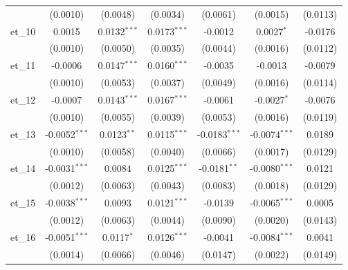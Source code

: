 \begin{tabular}{lcccccc}
                      & (0.0010)         & (0.0048)             & (0.0034)              & (0.0061)        & (0.0015)        & (0.0113)\\   
   et\_10             & 0.0015           & 0.0132$^{***}$       & 0.0173$^{***}$        & -0.0012         & 0.0027$^{*}$    & -0.0176\\   
                      & (0.0010)         & (0.0050)             & (0.0035)              & (0.0044)        & (0.0016)        & (0.0112)\\   
   et\_11             & -0.0006          & 0.0147$^{***}$       & 0.0160$^{***}$        & -0.0035         & -0.0013         & -0.0079\\   
                      & (0.0010)         & (0.0053)             & (0.0037)              & (0.0049)        & (0.0016)        & (0.0114)\\   
   et\_12             & -0.0007          & 0.0143$^{***}$       & 0.0167$^{***}$        & -0.0061         & -0.0027$^{*}$   & -0.0076\\   
                      & (0.0010)         & (0.0055)             & (0.0039)              & (0.0053)        & (0.0016)        & (0.0119)\\   
   et\_13             & -0.0052$^{***}$  & 0.0123$^{**}$        & 0.0115$^{***}$        & -0.0183$^{***}$ & -0.0074$^{***}$ & 0.0189\\   
                      & (0.0010)         & (0.0058)             & (0.0040)              & (0.0066)        & (0.0017)        & (0.0129)\\   
   et\_14             & -0.0031$^{***}$  & 0.0084               & 0.0125$^{***}$        & -0.0181$^{**}$  & -0.0080$^{***}$ & 0.0121\\   
                      & (0.0012)         & (0.0063)             & (0.0043)              & (0.0083)        & (0.0018)        & (0.0129)\\   
   et\_15             & -0.0038$^{***}$  & 0.0093               & 0.0121$^{***}$        & -0.0139         & -0.0065$^{***}$ & 0.0005\\   
                      & (0.0012)         & (0.0063)             & (0.0044)              & (0.0090)        & (0.0020)        & (0.0143)\\   
   et\_16             & -0.0051$^{***}$  & 0.0117$^{*}$         & 0.0126$^{***}$        & -0.0041         & -0.0084$^{***}$ & 0.0041\\   
                      & (0.0014)         & (0.0066)             & (0.0046)              & (0.0147)        & (0.0022)        & (0.0149)\\   

\end{tabular}
